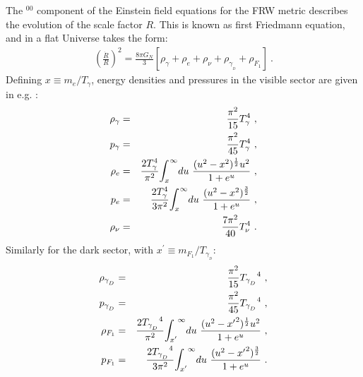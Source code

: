 \documentclass[12pt]{article}
\begin{document}
The $^{00}$ component of the Einstein field equations for the FRW metric
describes the evolution of the scale factor $R$. This is known as first
Friedmann equation, and in a flat Universe takes the form:
%
\begin{eqnarray}
\left ( \frac{\dot{R}}{R} \right ) ^2 = \frac{8\pi G_N}{3} \left [\rho
_{\gamma} + \rho _e + \rho _{\nu} + \rho _{\gamma _{_D}} + \rho _{F_1}
\right ] \ .
\label{Friedmann}
\end{eqnarray}
%
Defining $x \equiv m _e/T _{\gamma}$, energy densities and pressures in
the visible sector are given in e.g. \cite{earlyuniverse}:
%
\begin{eqnarray}
\rho _{\gamma} &=& \frac{\pi ^2}{15} T _{\gamma} ^4 \ , \nonumber \\
p _{\gamma} &=& \frac{\pi ^2}{45} T _{\gamma} ^4 \ , \nonumber \\
\rho _e &=& \frac{2T _{\gamma} ^4}{\pi ^2} \mathlarger \int _{x}
^{\infty}du \ \frac{(u^2 - x^2)^{\frac{1}{2}}u^2}{1 + e^u} \ , \nonumber
\\
p _e &=& \frac{2T _{\gamma} ^4}{3\pi ^2} \mathlarger \int _{x}
^{\infty}du \ \frac{(u^2 - x^2)^{\frac{3}{2}}}{1 + e^u} \ , \nonumber \\
\rho _{\nu} &=& \frac{7\pi ^2}{40} T _{\nu} ^4 \ .
\end{eqnarray}
%
Similarly for the dark sector, with $x ^{'} \equiv m _{F_1}/T _{\gamma
_{_D}}$:
%
\begin{eqnarray}
\rho _{\gamma _{_D}} &=& \frac{\pi ^2}{15} {T _{\gamma _{_D}}}^4 \ ,
\nonumber \\
p _{\gamma _{_D}} &=& \frac{\pi ^2}{45} {T _{\gamma _{_D}}} ^4 \ ,
\nonumber \\
\rho _{F_1} &=& \frac{2{T _{\gamma _{_D}}} ^4}{\pi ^2} \mathlarger \int
_{x'} ^{\infty}du \ \frac{(u^2 - {x'}^2)^{\frac{1}{2}}u^2}{1 + e^u} \ ,
\nonumber \\
p _{F_1} &=& \frac{2{T _{\gamma _{_D}}} ^4}{3\pi ^2} \mathlarger \int
_{x'} ^{\infty}du \ \frac{(u^2 - {x'}^2)^{\frac{3}{2}}}{1 + e^u} \ .
\end{eqnarray}
%
\end{document}
